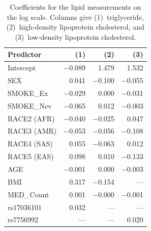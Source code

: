 \begin{table}[ht]
\centering
\caption{Coefficients for the lipid measurements on the log scale. Columns give (1)~triglyceride, (2)~high-density lipoprotein cholesterol, and (3)~low-density lipoprotein cholesterol.}
\label{tab:app_coef_lipids}
\small
\begin{tabular}{lrrr}
\hline
\textbf{Predictor} & \textbf{(1)} & \textbf{(2)} & \textbf{(3)} \\
\hline
Intercept    & $-$0.089 &  1.479 &  1.532 \\
SEX          &    0.041 & $-$0.100 & $-$0.055 \\
SMOKE\_Ex    & $-$0.029 &  0.000 & $-$0.031 \\
SMOKE\_Nev   & $-$0.065 &  0.012 & $-$0.003 \\
RACE2 (AFR)  & $-$0.040 & $-$0.025 &  0.047 \\
RACE3 (AMR)  & $-$0.053 & $-$0.056 & $-$0.108 \\
RACE4 (SAS)  &    0.055 & $-$0.063 &  0.012 \\
RACE5 (EAS)  &    0.098 &  0.010 & $-$0.133 \\
AGE          & $-$0.001 &  0.000 & $-$0.003 \\
BMI          &    0.317 & $-$0.154 &    --- \\
MED\_Count   &    0.001 & $-$0.000 & $-$0.001 \\
rs17036101   &    0.032 &    --- &    --- \\
rs7756992    &      --- &    --- &  0.020 \\
\hline
\end{tabular}
\end{table}

